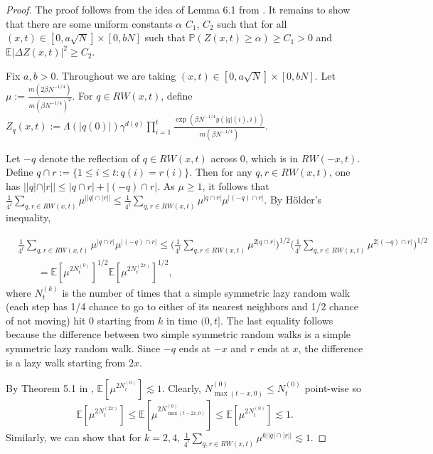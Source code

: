 \documentclass[10pt]{article}
\begin{document}
\begin{proof}
    The proof follows from the idea of Lemma 6.1 from \cite{Chatterjee2021WeakCO}. It remains to show that there are some uniform constants $\alpha$ $C_1$, $C_2$ such that for all $(x,t) \in [0, a\sqrt{N}] \times [0, bN]$ such that $\mathbb{P}(Z(x,t) \geq \alpha) \geq C_1 >0$ and $\mathbb{E}|\Delta Z(x,t)|^2 \geq C_2$.
    
Fix $a,b>0$. Throughout we are taking $(x,t) \in [0,a\sqrt{N}] \times [0, bN]$. Let $\mu:=\frac{m(2\beta N^{-1/4})}{m(\beta N^{-1/4})^2}$. For $q \in RW(x,t)$, define $Z_q(x,t):=\Lambda(|q(0)|)\gamma^{d(q)} \prod_{i=1}^{t} \frac{\exp(\beta N^{-1/4}y(|q|(i),i))}{m(\beta N^{-1/4})} .$ 

 Let $-q$ denote the reflection of $q \in RW(x,t)$ across $0$, which is in $RW(-x,t)$. Define $q \cap r := \{1 \leq i \leq t: q(i)=r(i)\}$. Then for any $q, r \in RW(x,t)$, one has $||q| \cap |r|| \leq |q \cap r| + |(-q) \cap r|$. As $\mu \geq 1$, it follows that $\frac{1}{4^t}\sum_{q, r \in RW(x,t)} \mu^{\left| |q|\cap |r|\right|} \leq \frac{1}{4^t}\sum_{q, r \in RW(x,t)} \mu^{\left| q\cap r\right|} \mu^{\left| (-q)\cap r\right|}$. By Hölder's inequality,

\begin{equation} \label{arg1}
    \begin{aligned}
&\frac{1}{4^t}\sum_{q, r \in RW(x,t)} \mu^{\left| q\cap r\right|} \mu^{\left| (-q)\cap r\right|} \leq \Big(\frac{1}{4^t}\sum_{q, r \in RW(x,t)} \mu^{2\left| q\cap r\right|}\Big)^{1/2}\Big(\frac{1}{4^t}\sum_{q, r \in RW(x,t)} \mu^{2\left| (-q)\cap r\right|}\Big)^{1/2}\\
& \qquad =\mathbb{E}[\mu^{2N_t^{(0)}}]^{1/2} \mathbb{E}[\mu^{2N_t^{(2x)}}]^{1/2},
    \end{aligned}
\end{equation}
where $N_t^{(k)}$ is the number of times that a simple symmetric lazy random walk (each step has 1/4 chance to go to either of its nearest neighbors and 1/2 chance of not moving) hit 0 starting from $k$ in time $(0, t]$. The last equality follows because the difference between two simple symmetric random walks is a simple symmetric lazy random walk. Since $-q$ ends at $-x$ and $r$ ends at $x$, the difference is a lazy walk starting from $2x$.


By Theorem 5.1 in \cite{adhikari2022invariance}, $\mathbb{E}[\mu^{2N_t^{(0)}}] \lesssim 1$. Clearly, $N_{\max(t-x,0)}^{(0)} \leq N_t^{(0)}$ point-wise so 
\begin{equation} \label{arg2}
    \mathbb{E}\left[\mu^{2N_t^{(2x)}}\right] \leq \mathbb{E}\left[\mu^{2N_{\max(t-2x,0)}^{(0)}}\right] \leq \mathbb{E}\left[\mu^{2N_t^{(0)}}\right] \lesssim 1.
\end{equation} Similarly, we can show that for $k=2,4$, $\frac{1}{4^t}\sum_{q, r \in RW(x,t)} \mu^{k\left||q|\cap |r|\right|} \lesssim 1.$


\end{proof}
\end{document}
